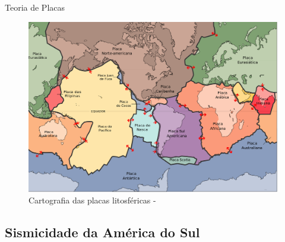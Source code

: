 \documentclass[ucs,8pt]{beamer}
\begin{document}
\begin{frame}{Teoria de Placas}
\begin{figure}[H]
   \centering
   \includegraphics[height=0.95\textheight]{litho_plates_overview}
   \caption[Cartografia das placas litosféricas]
   		   {Cartografia das placas litosféricas - \citet{usgs_plates_1996}} 
   \label{f:plates_overview}
\end{figure} 
\end{frame}



\subsection{Sismicidade da América do Sul}
\end{document}
